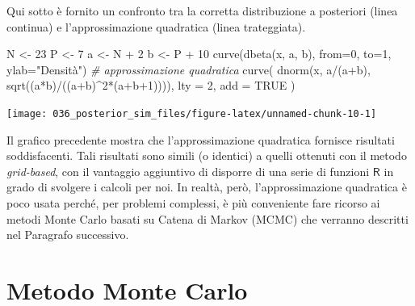 \documentclass[
  10pt,
  italian,
  a4paper,
  extrafontsizes,onecolumn,openright
  ]{memoir}
\newenvironment{Shaded}{\begin{snugshade}}{\end{snugshade}}
\newcommand{\AttributeTok}[1]{\textcolor[rgb]{0.77,0.63,0.00}{#1}}
\newcommand{\CommentTok}[1]{\textcolor[rgb]{0.56,0.35,0.01}{\textit{#1}}}
\newcommand{\ConstantTok}[1]{\textcolor[rgb]{0.00,0.00,0.00}{#1}}
\newcommand{\DecValTok}[1]{\textcolor[rgb]{0.00,0.00,0.81}{#1}}
\newcommand{\FunctionTok}[1]{\textcolor[rgb]{0.00,0.00,0.00}{#1}}
\newcommand{\NormalTok}[1]{#1}
\newcommand{\OtherTok}[1]{\textcolor[rgb]{0.56,0.35,0.01}{#1}}
\newcommand{\SpecialCharTok}[1]{\textcolor[rgb]{0.00,0.00,0.00}{#1}}
\newcommand{\StringTok}[1]{\textcolor[rgb]{0.31,0.60,0.02}{#1}}
\newcommand{\R}{\textsf{R}} %
\begin{document}
Qui sotto è fornito un confronto tra la corretta distribuzione a posteriori (linea continua) e l'approssimazione quadratica (linea trateggiata).

\begin{Shaded}
\begin{Highlighting}[]
\NormalTok{N }\OtherTok{\textless{}{-}} \DecValTok{23}
\NormalTok{P }\OtherTok{\textless{}{-}} \DecValTok{7}
\NormalTok{a }\OtherTok{\textless{}{-}}\NormalTok{ N }\SpecialCharTok{+} \DecValTok{2}
\NormalTok{b }\OtherTok{\textless{}{-}}\NormalTok{ P }\SpecialCharTok{+} \DecValTok{10}
\FunctionTok{curve}\NormalTok{(}\FunctionTok{dbeta}\NormalTok{(x, a, b), }\AttributeTok{from=}\DecValTok{0}\NormalTok{, }\AttributeTok{to=}\DecValTok{1}\NormalTok{, }\AttributeTok{ylab=}\StringTok{"Densità"}\NormalTok{)}
\CommentTok{\# approssimazione quadratica}
\FunctionTok{curve}\NormalTok{(}
  \FunctionTok{dnorm}\NormalTok{(x, a}\SpecialCharTok{/}\NormalTok{(a}\SpecialCharTok{+}\NormalTok{b), }\FunctionTok{sqrt}\NormalTok{((a}\SpecialCharTok{*}\NormalTok{b)}\SpecialCharTok{/}\NormalTok{((a}\SpecialCharTok{+}\NormalTok{b)}\SpecialCharTok{\^{}}\DecValTok{2}\SpecialCharTok{*}\NormalTok{(a}\SpecialCharTok{+}\NormalTok{b}\SpecialCharTok{+}\DecValTok{1}\NormalTok{)))),}
  \AttributeTok{lty =} \DecValTok{2}\NormalTok{,}
  \AttributeTok{add =} \ConstantTok{TRUE}
\NormalTok{)}
\end{Highlighting}
\end{Shaded}

\begin{center}\texttt{[image: 036\_posterior\_sim\_files/figure-latex/unnamed-chunk-10-1]} \end{center}

Il grafico precedente mostra che l'approssimazione quadratica fornisce risultati soddisfacenti. Tali risultati sono simili (o identici) a quelli ottenuti con il metodo \emph{grid-based}, con il vantaggio aggiuntivo di disporre di una serie di funzioni \(\R\) in grado di svolgere i calcoli per noi. In realtà, però, l'approssimazione quadratica è poco usata perché, per problemi complessi, è più conveniente fare ricorso ai metodi Monte Carlo basati su Catena di Markov (MCMC) che verranno descritti nel Paragrafo successivo.

\hypertarget{chapter-simulazioneMC}{%
\section{Metodo Monte Carlo}\label{chapter-simulazioneMC}}
\end{document}
